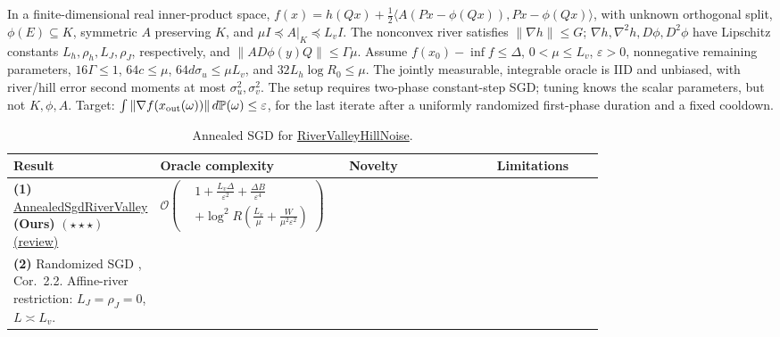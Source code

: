 \begin{table}[tp]
\centering
\caption{Annealed SGD for \href{https://github.com/k3nfalt/longtails/blob/main/LongTails/Setups/RiverValleyHillNoise.lean}{RiverValleyHillNoise}.}\label{tab:RiverValleyHillNoise}
\parbox{\linewidth}{\footnotesize
In a finite-dimensional real inner-product space, $f(x)=h(Qx)+\tfrac12\langle A(Px-\phi(Qx)),Px-\phi(Qx)\rangle$, with unknown orthogonal split, $\phi(E)\subseteq K$, symmetric $A$ preserving $K$, and $\mu I\preceq A|_K\preceq L_v I$.
The nonconvex river satisfies $\|\nabla h\|\le G$; $\nabla h,\nabla^2h,D\phi,D^2\phi$ have Lipschitz constants $L_h,\rho_h,L_J,\rho_J$, respectively, and $\|AD\phi(y)Q\|\le\Gamma\mu$.
Assume $f(x_0)-\inf f\le\Delta$, $0<\mu\le L_v$, $\varepsilon>0$, nonnegative remaining parameters, $16\Gamma\le1$, $64c\le\mu$, $64d\sigma_u\le\mu L_v$, and $32L_h\log R_0\le\mu$.
The jointly measurable, integrable oracle is IID and unbiased, with river/hill error second moments at most $\sigma_u^2,\sigma_v^2$.
The setup requires two-phase constant-step SGD; tuning knows the scalar parameters, but not $K,\phi,A$.
Target: $\int\|\nabla f(x_{\rm out}(\omega))\|\,d\mathbb P(\omega)\le\varepsilon$, for the last iterate after a uniformly randomized first-phase duration and a fixed cooldown.}\par\smallskip
\begin{threeparttable}
\footnotesize
\setlength{\tabcolsep}{4pt}\renewcommand{\arraystretch}{1.25}
\begin{tabularx}{\linewidth}{@{}>{\raggedright\arraybackslash}p{0.20\linewidth}>{\raggedright\arraybackslash}p{0.32\linewidth}>{\raggedright\arraybackslash}p{0.25\linewidth}>{\raggedright\arraybackslash}X@{}}
\toprule
\textbf{Result} & \textbf{Oracle complexity} & \textbf{Novelty} & \textbf{Limitations} \\
\midrule
\textbf{(1)} \href{https://github.com/k3nfalt/longtails/blob/main/LongTails/Theorems/AnnealedSgdRiverValley.lean}{Annealed\allowbreak Sgd\allowbreak River\allowbreak Valley} \textbf{(Ours)} $(\star\star\star)$ \href{https://github.com/k3nfalt/longtails/blob/main/scripts/reviews/AnnealedSgdRiverValley.md}{(review)}
& $\displaystyle\mathcal{O}\!\left(\begin{aligned}&1+\frac{L_v\Delta}{\varepsilon^2}+\frac{\Delta B}{\varepsilon^4}\\&+\log^2R\left(\frac{L_v}{\mu}+\frac{W}{\mu^2\varepsilon^2}\right)\end{aligned}\right)$
& & \\
\midrule[1.2pt]
\textbf{(2)} Randomized SGD \citep{rvGhadimiLan2013v1}, Cor.~2.2. Affine-river restriction: $L_J=\rho_J=0$, $L\asymp L_v$.

\end{tabularx}
\end{threeparttable}
\end{table}
